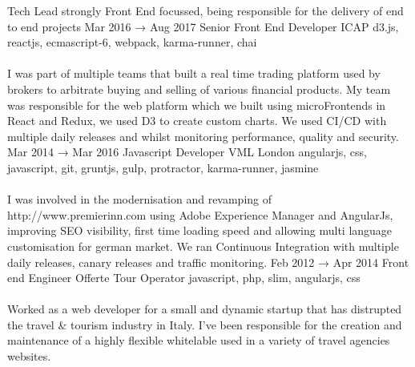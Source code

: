 \documentclass[9pt]{stackoverflow} %
\begin{document}
\begin{tcolorbox}
{\begin{entrylist}
{		Tech Lead strongly Front End focussed, being responsible for the delivery of end to end projects}
	\entry
		{Mar 2016 → Aug 2017}
		{Senior Front End Developer}
		{ICAP}
		{{d3.js, reactjs, ecmascript-6, webpack, karma-runner, chai}\\\\
		I was part of multiple teams that built a real time trading platform used by brokers to arbitrate buying and selling of various financial products.
My team was responsible for the web platform which we built using microFrontends in React and Redux, we used D3 to create custom charts. We used CI/CD with multiple daily releases and whilst monitoring performance, quality and security.}
	\entry
		{Mar 2014 → Mar 2016}
		{Javascript Developer}
		{VML London}
		{{angularjs, css, javascript, git, gruntjs, gulp, protractor, karma-runner, jasmine}\\\\
		I was involved in the modernisation and revamping of http://www.premierinn.com using Adobe Experience Manager and AngularJs, improving SEO visibility, first time loading speed and allowing multi language customisation for german market.
		We ran Continuous Integration with multiple daily releases, canary releases and traffic monitoring.}
	\entry
		{Feb 2012 → Apr 2014}
		{Front end Engineer}
		{Offerte Tour Operator}
		{{javascript, php, slim, angularjs, css}\\\\
		Worked as a web developer for a small and dynamic startup that has distrupted the travel \& tourism industry in Italy. I've been responsible for the creation and maintenance of a highly flexible whitelable used in a variety of travel agencies websites.}
	\end{entrylist}}
\end{tcolorbox}

\end{document}
